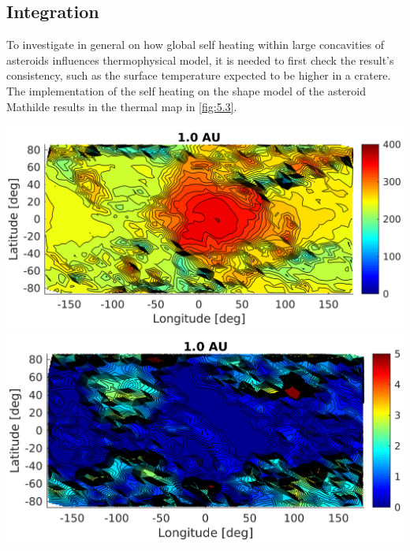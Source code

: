 \subsection{Integration}
To investigate in general on how global self heating within large concavities of asteroids influences thermophysical model, it is needed to first check the result's consistency, such as the surface temperature expected to be higher in a cratere. The implementation of the self heating on the shape model of the asteroid Mathilde results in the thermal map in \autoref{fig:5.3}.
\begin{center}
    \includegraphics[width=\linewidth]{rsc/self_2D.png}
    \includegraphics[width=\linewidth]{rsc/self_2D_diff.png}
    \label{fig:5.3}
\end{center}

